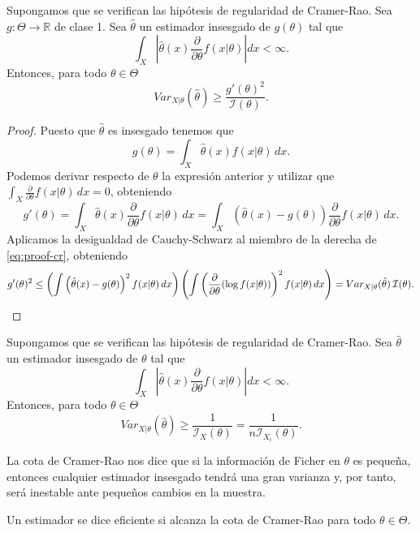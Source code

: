     \begin{thm}
        Supongamos que se verifican las hipótesis de regularidad de Cramer-Rao. Sea $g: \Theta \to  \mathbb{R}$ de clase 1. Sea $\hat{\theta}$ un estimador insesgado de $g(\theta)$ tal que
        \[\int_X \left|\hat{\theta}(x) \frac{\partial}{\partial \theta}f(x | \theta)\right| dx < \infty.\]
        Entonces, para todo $\theta \in \Theta$
        \[Var_{X|\theta}(\hat{\theta}) \ge \frac{g'(\theta)^2}{\mathcal{I}(\theta)}.\]
    \end{thm}
    \begin{proof}
        Puesto que $\hat{\theta}$ es insesgado tenemos que
        \[g(\theta) = \int_X \hat{\theta}(x) f(x|\theta)\,dx.\]
        Podemos derivar respecto de $\theta$ la expresión anterior y utilizar que $\int_X \frac{\partial}{\partial \theta}f(x|\theta) \, dx = 0$, obteniendo
        \begin{equation}\label{eq:proof-cr}
        g'(\theta) = \int_X \hat{\theta}(x)\frac{\partial}{\partial \theta}f(x|\theta)\,dx = \int_X \left(\hat{\theta}(x) - g(\theta)\right)\frac{\partial}{\partial \theta}f(x|\theta)\,dx.
        \end{equation}
        Aplicamos la desigualdad de Cauchy-Schwarz al miembro de la derecha de \eqref{eq:proof-cr}, obteniendo
        \[g'(\theta)^2  \le \left( \int \left(\hat\theta(x) - g(\theta)\right)^2 f(x|\theta) \, dx \right) \left(\int \left( \frac{\partial}{\partial\theta} (\log f(x|\theta)) \right)^2 f(x|\theta) \, dx \right) = Var_{X|\theta}(\hat\theta) \, \mathcal{I}(\theta). \qedhere\]
    \end{proof}

    \begin{cor}
        Supongamos que se verifican las hipótesis de regularidad de Cramer-Rao. Sea $\hat{\theta}$ un estimador insesgado de $\theta$ tal que
        \[\int_X \left|\hat{\theta}(x) \frac{\partial}{\partial \theta} f(x | \theta)\right| dx < \infty.\]
        Entonces, para todo $\theta \in \Theta$
        \[Var_{X|\theta}(\hat{\theta}) \ge \frac{1}{\mathcal{I}_X(\theta)} = \frac{1}{n\mathcal{I}_{X_i}(\theta)}.\]
    \end{cor}

    La cota de Cramer-Rao nos dice que si la información de Ficher en $\theta$ es pequeña, entonces cualquier estimador insesgado tendrá una gran varianza y, por tanto, será inestable ante pequeños cambios en la muestra.

    \begin{definition}
        Un estimador se dice eficiente si alcanza la cota de Cramer-Rao para todo $\theta \in \Theta$.
    \end{definition}

